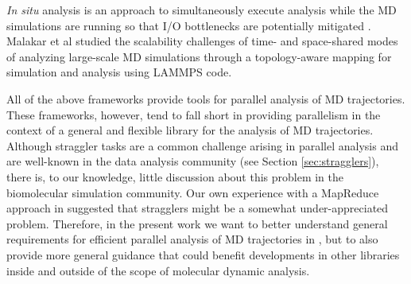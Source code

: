 \textit{In situ} analysis is an approach to simultaneously execute analysis while the MD simulations are running so that I/O bottlenecks are potentially mitigated \cite{Malakar-etal}.
Malakar et al studied the scalability challenges of time- and space-shared modes of analyzing large-scale MD simulations through a topology-aware mapping for simulation and analysis using LAMMPS code.

All of the above frameworks provide tools for parallel analysis of MD trajectories. 
These frameworks, however, tend to fall short in providing parallelism in the context of a general and flexible library for the analysis of MD trajectories.
Although straggler tasks are a common challenge arising in parallel analysis and are well-known in the data analysis community (see Section \ref{sec:stragglers}), there is, to our knowledge, little discussion about this problem in the biomolecular simulation community.
Our own experience with a MapReduce approach in  \cite{Khoshlessan:2017ab} suggested that stragglers might be a somewhat under-appreciated problem.
Therefore, in the present work we want to better understand general requirements for efficient parallel analysis of MD trajectories in , but to also provide more general guidance that could benefit developments in other libraries inside and outside of the scope of molecular dynamic analysis.




